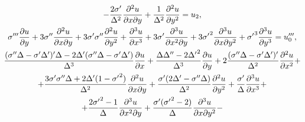 \begin{gather}
-\frac{2\sigma'}{\Delta^2}\frac{\partial^2 u}{\partial x \partial y}


+\frac{1}{\Delta^2}\frac{\partial^2 u}{\partial y^2}=


u_{2},\notag \\


%


\sigma'''\frac{\partial u}{\partial y}


+3\sigma''\frac{\partial^2 u}{\partial x \partial y}


+3\sigma'\sigma''\frac{\partial^2 u}{\partial y^2}


+\frac{\partial^3 u}{\partial x^3}


+3\sigma'\frac{\partial^3 u}{\partial x^2 \partial y}+


3{\sigma'}^2\frac{\partial^3 u}{\partial x \partial y^2}


+{\sigma'}^3\frac{\partial^3 u}{\partial y^3}=


u'''_{0},\notag \\


%


\frac{(\sigma''\Delta-\sigma'\Delta')'\Delta-2\Delta'(\sigma''\Delta-


\sigma'\Delta')}{\Delta^3}\frac{\partial u}{\partial x}


+\frac{\Delta\Delta''-2{\Delta'}^2}{\Delta^3}


\frac{\partial u}{\partial y}+


2\frac{(\sigma''\Delta-\sigma'\Delta')'}{\Delta^2}


\frac{\partial^2 u}{\partial x^2}+ \label{13} \\


%


+\frac{3\sigma'\sigma''\Delta+2\Delta'(1-{\sigma'}^2)}{\Delta^2}


\frac{\partial^2 u}{\partial x \partial y}+


\frac{\sigma'(2\Delta'-\sigma''\Delta)}{\Delta^2}


\frac{\partial^2 u}{\partial y^2}


+\frac{\sigma'}{\Delta}\frac{\partial^3 u}{\partial x^3}+\notag \\


%


+\frac{2{\sigma'}^2-1}{\Delta}


\frac{\partial^3 u}{\partial x^2 \partial y}+


\frac{\sigma'({\sigma'}^2-2)}{\Delta}


\frac{\partial^3 u}{\partial x \partial y^2}-



\end{gather}
